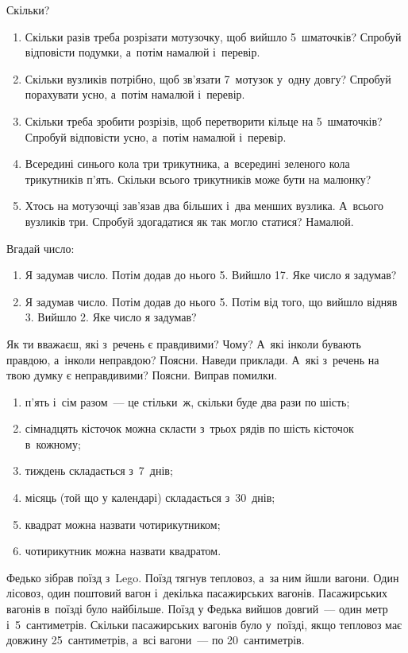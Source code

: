 \problem
Скільки?
\begin{enumerate}
    \item Скільки разів треба розрізати мотузочку, щоб вийшло 5~шматочків?
    Спробуй відповісти подумки, а~потім намалюй і~перевір.
    \item Скільки вузликів потрібно, щоб зв'язати 7~мотузок у~одну довгу?
    Спробуй порахувати усно, а~потім намалюй і~перевір.
    \item Скільки треба зробити розрізів, щоб перетворити кільце
    на 5~шматочків? Спробуй відповісти усно, а~потім намалюй і~перевір.
    \item Всередині синього кола три трикутника, а~всередині зеленого кола
    трикутників п'ять. Скільки всього трикутників може бути на малюнку?
    \item Хтось на мотузочці зав'язав два більших і~два менших вузлика.
    А~всього вузликів три. Спробуй здогадатися як так могло статися? Намалюй.
\end{enumerate}


\problem
Вгадай число:
\begin{enumerate}
    \item Я задумав число. Потім додав до нього 5. Вийшло 17.
    Яке число я задумав?
    \item Я задумав число. Потім додав до нього 5.
    Потім від того, що вийшло відняв 3. Вийшло 2.
    Яке число я задумав?
\end{enumerate}


\problem
Як ти вважаєш, які з~речень є правдивими? Чому?
А~які інколи бувають правдою, а~інколи неправдою? Поясни. Наведи приклади.
А~які з~речень на твою думку є неправдивими? Поясни. Виправ помилки.
\begin{enumerate}
    \item п'ять і~сім разом~--- це стільки~ж, скільки буде два рази по шість;
    \item сімнадцять кісточок можна скласти з~трьох рядів
    по шість кісточок в~кожному;
    \item тиждень складається з~7~днів;
    \item місяць (той що у календарі) складається з~30~днів;
    \item квадрат можна назвати чотирикутником;
    \item чотирикутник можна назвати квадратом.
\end{enumerate}


\problem
Федько зібрав поїзд з~Lego. Поїзд тягнув тепловоз, а~за ним йшли вагони.
Один лісовоз, один поштовий вагон і~декілька пасажирських вагонів.
Пасажирських вагонів в~поїзді було найбільше.
Поїзд у Федька вийшов довгий~--- один метр і~5~сантиметрів.
Скільки пасажирських вагонів було у~поїзді,
якщо тепловоз має довжину 25~сантиметрів, а~всі вагони~--- по 20~сантиметрів. 


